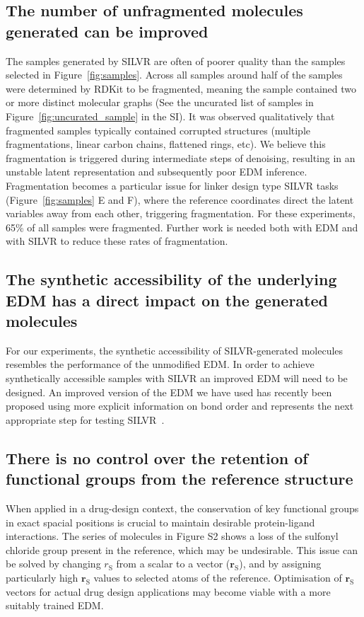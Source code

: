\documentclass[journal=jacsat,manuscript=article]{achemso}
\begin{document}
\subsection{The number of unfragmented molecules generated can be improved}
The samples generated by SILVR are often of poorer quality than the samples selected in Figure~\ref{fig:samples}. Across all samples around half of the samples were determined by RDKit to be fragmented, meaning the sample contained two or more distinct molecular graphs (See the uncurated list of samples in Figure~\ref{fig:uncurated_sample} in the SI). It was observed qualitatively that fragmented samples typically contained corrupted structures (multiple fragmentations, linear carbon chains, flattened rings, etc). We believe this fragmentation is triggered during intermediate steps of denoising, resulting in an unstable latent representation and subsequently poor EDM inference. Fragmentation becomes a particular issue for linker design type SILVR tasks (Figure~\ref{fig:samples} E and F), where the reference coordinates direct the latent variables away from each other, triggering fragmentation. For these experiments, 65\% of all samples were fragmented. Further work is needed both with EDM and with SILVR to reduce these rates of fragmentation. 

\subsection{The synthetic accessibility of the underlying EDM has a direct impact on the generated molecules}
 For our experiments, the synthetic accessibility of SILVR-generated molecules resembles the performance of the unmodified EDM. In order to achieve synthetically accessible samples with SILVR an improved EDM will need to be designed. An improved version of the EDM we have used has recently been proposed using more explicit information on bond order and represents the next appropriate step for testing SILVR~\cite{vignac2023midi}.

\subsection{There is no control over the retention of functional groups from the reference structure}
When applied in a drug-design context, the conservation of key functional groups in exact spacial positions is crucial to maintain desirable protein-ligand interactions. The series of molecules in Figure S2 shows a loss of the sulfonyl chloride group present in the reference, which may be undesirable. This issue can be solved by changing $r_{\mathrm{S}}$ from a scalar to a vector ($\mathbf{r}_{\mathrm{S}}$), and by assigning particularly high $\mathbf{r}_{\mathrm{S}}$ values to selected atoms of the reference. Optimisation of $\mathbf{r}_{\mathrm{S}}$ vectors for actual drug design applications may become viable with a more suitably trained EDM.
\end{document}
